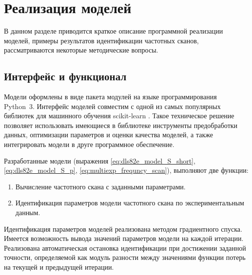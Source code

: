 \section{Реализация моделей}
	В данном разделе приводится краткое описание программной реализации
	моделей, примеры результатов идентификации частотных сканов, рассматриваются 
	некоторые методические вопросы.


	\subsection{Интерфейс и функционал}
	Модели оформлены в виде пакета модулей на языке программирования Python~3.
	Интерфейс моделей совместим с одной из самых популярных библиотек для 
	машинного обучения scikit-learn \cite{sklearn_website}. Такое техническое
	решение позволяет использовать имеющиеся в библиотеке инструменты 
	предобработки данных, оптимизации параметров и оценки качества моделей, 
	а также интегрировать модели в друге программное обеспечение.

	Разработанные модели (выражения	\ref{eq:dls82e_model_S_short}, 
	\ref{eq:dls82e_model_S_p}, \ref{eq:multiexp_frequncy_scan}), выполняют две 
	функции:
	\begin{enumerate}
		\item Вычисление частотного скана с заданными параметрами.
		\item Идентификация параметров модели частотного скана по 
		экспериментальным данным.
	\end{enumerate}
	Идентификация параметров моделей реализована методом градиентного спуска.
	Имеется возможность вывода значений параметров модели на каждой итерации.
	Реализована автоматическая остановка идентификации при достижении заданной 
	точности, определяемой как модуль разности между значениями функции потерь 
	на текущей и предыдущей итерации.

